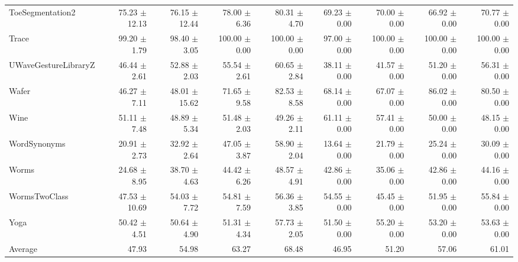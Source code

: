 \begin{landscape}
\begin{longtable}{lrrrrrrrr}
ToeSegmentation2 & 75.23 $\pm$ 12.13 & 76.15 $\pm$ 12.44 & 78.00 $\pm$ 6.36 & 80.31 $\pm$ 4.70 & 69.23 $\pm$ 0.00 & 70.00 $\pm$ 0.00 & 66.92 $\pm$ 0.00 & 70.77 $\pm$ 0.00 \\
Trace & 99.20 $\pm$ 1.79 & 98.40 $\pm$ 3.05 & 100.00 $\pm$ 0.00 & 100.00 $\pm$ 0.00 & 97.00 $\pm$ 0.00 & 100.00 $\pm$ 0.00 & 100.00 $\pm$ 0.00 & 100.00 $\pm$ 0.00 \\
UWaveGestureLibraryZ & 46.44 $\pm$ 2.61 & 52.88 $\pm$ 2.03 & 55.54 $\pm$ 2.61 & 60.65 $\pm$ 2.84 & 38.11 $\pm$ 0.00 & 41.57 $\pm$ 0.00 & 51.20 $\pm$ 0.00 & 56.31 $\pm$ 0.00 \\
Wafer & 46.27 $\pm$ 7.11 & 48.01 $\pm$ 15.62 & 71.65 $\pm$ 9.58 & 82.53 $\pm$ 8.58 & 68.14 $\pm$ 0.00 & 67.07 $\pm$ 0.00 & 86.02 $\pm$ 0.00 & 80.50 $\pm$ 0.00 \\
Wine & 51.11 $\pm$ 7.48 & 48.89 $\pm$ 5.34 & 51.48 $\pm$ 2.03 & 49.26 $\pm$ 2.11 & 61.11 $\pm$ 0.00 & 57.41 $\pm$ 0.00 & 50.00 $\pm$ 0.00 & 48.15 $\pm$ 0.00 \\
WordSynonyms & 20.91 $\pm$ 2.73 & 32.92 $\pm$ 2.64 & 47.05 $\pm$ 3.87 & 58.90 $\pm$ 2.04 & 13.64 $\pm$ 0.00 & 21.79 $\pm$ 0.00 & 25.24 $\pm$ 0.00 & 30.09 $\pm$ 0.00 \\
Worms & 24.68 $\pm$ 8.95 & 38.70 $\pm$ 4.63 & 44.42 $\pm$ 6.26 & 48.57 $\pm$ 4.91 & 42.86 $\pm$ 0.00 & 35.06 $\pm$ 0.00 & 42.86 $\pm$ 0.00 & 44.16 $\pm$ 0.00 \\
WormsTwoClass & 47.53 $\pm$ 10.69 & 54.03 $\pm$ 7.72 & 54.81 $\pm$ 7.59 & 56.36 $\pm$ 3.85 & 54.55 $\pm$ 0.00 & 45.45 $\pm$ 0.00 & 51.95 $\pm$ 0.00 & 55.84 $\pm$ 0.00 \\
Yoga & 50.42 $\pm$ 4.51 & 50.64 $\pm$ 4.90 & 51.31 $\pm$ 4.34 & 57.73 $\pm$ 2.05 & 51.50 $\pm$ 0.00 & 55.20 $\pm$ 0.00 & 53.20 $\pm$ 0.00 & 53.63 $\pm$ 0.00 \\
\midrule
Average & 47.93 & 54.98 & 63.27 & 68.48 & 46.95 & 51.20 & 57.06 & 61.01 \\
\bottomrule
\end{longtable}
\end{landscape}
